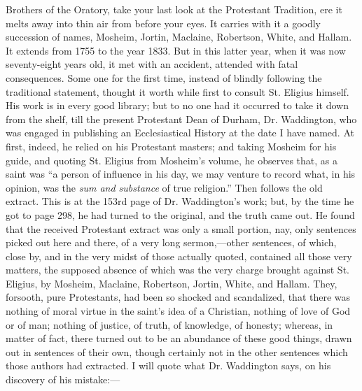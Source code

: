 Brothers of the Oratory, take your last look at the
Protestant Tradition, ere it melts away into thin air
from before your eyes. It carries with it a goodly
succession of names, Mosheim, Jortin, Maclaine,
Robertson, White, and Hallam. It extends from 1755 to the
year 1833. But in this latter year, when it was now
seventy-eight years old, it met with an accident,
attended with fatal consequences. Some one for the first
time, instead of blindly following the traditional
statement, thought it worth while first to consult St.
Eligius himself. His work is in every good library; but
to no one had it occurred to take it down from the shelf,
till the present Protestant Dean of Durham, Dr.
Waddington, who was engaged in publishing an
Ecclesiastical History at the date I have named. At
first, indeed, he relied on his Protestant masters; and
taking Mosheim for his guide, and quoting St. Eligius
from Mosheim's volume, he observes that, as a saint was
``a person of influence in his day, we may venture to
record what, in his opinion, was the \emph{sum and
substance} of true religion.'' Then follows the
old extract. This is at the 153rd page of Dr.
Waddington's work; but, by the time he got to page 298,
he had turned to the original, and the truth came out. He
found that the received Protestant extract was only a
small portion, nay, only sentences picked out here and
there, of a very long sermon,—other sentences, of
which, close by, and in the very midst of those actually
quoted, contained all those very matters, the supposed
absence of which was the very charge brought against St.
Eligius, by Mosheim, Maclaine, Robertson, Jortin, White,
and Hallam. They, forsooth, pure Protestants, had been so
shocked and scandalized, that there was nothing of moral
virtue in the saint's idea of a Christian, nothing of
love of God or of man; nothing of justice, of truth, of
knowledge, of honesty; whereas, in matter of fact, there
turned out to be an abundance of these good things, drawn
out in sentences of their own, though certainly not in
the other sentences which those authors had extracted. I
will quote what Dr. Waddington says, on his discovery of
his mistake:—

